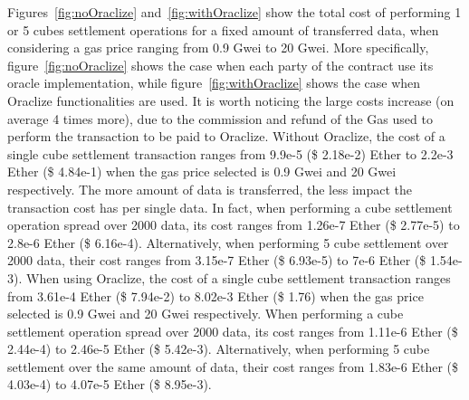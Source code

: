 \documentclass[chi_draft]{sigchi}
\begin{document}
{Figures~\ref{fig:noOraclize} and~\ref{fig:withOraclize} show the total cost of performing 1 or 5 cubes settlement operations for a fixed amount of transferred data, when considering a gas price ranging from 0.9 Gwei to 20 Gwei.
More specifically, figure~\ref{fig:noOraclize} shows the case when each party of the contract use its oracle implementation, while figure~\ref{fig:withOraclize} shows the case when Oraclize functionalities are used. 
It is worth noticing the large costs increase (on average 4 times more), due to the commission and refund of the Gas used to perform the transaction to be paid to Oraclize. 
Without Oraclize, the cost of a single cube settlement transaction ranges from 9.9e-5 (\$ 2.18e-2) Ether to 2.2e-3 Ether (\$ 4.84e-1) when the gas price selected is 0.9 Gwei and 20 Gwei respectively. The more amount of data is transferred, the less impact the transaction cost has per single data. In fact, when performing a cube settlement operation spread over 2000 data, its cost ranges from 1.26e-7 Ether (\$ 2.77e-5) to 2.8e-6 Ether (\$ 6.16e-4). Alternatively, when performing 5 cube settlement over 2000 data, their cost ranges from 3.15e-7 Ether (\$ 6.93e-5) to 7e-6 Ether (\$ 1.54e-3).
When using Oraclize, the cost of a single cube settlement transaction ranges from 3.61e-4 Ether (\$ 7.94e-2) to 8.02e-3 Ether (\$ 1.76) when the gas price selected is 0.9 Gwei and 20 Gwei respectively. When performing a cube settlement operation spread over 2000 data, its cost ranges from 1.11e-6 Ether (\$ 2.44e-4) to 2.46e-5 Ether (\$ 5.42e-3). Alternatively, when performing 5 cube settlement over the same amount of data, their cost ranges from 1.83e-6 Ether (\$ 4.03e-4) to 4.07e-5 Ether (\$ 8.95e-3).
\begin{table}[!htp]
	\centering
	\caption{Estimated data price for different use cases.}
	\label{tab:data_price}
\end{table}

}
\end{document}
